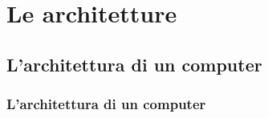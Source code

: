 \section[Le architetture]{Le architetture}

\subsection[L'architettura di un computer]{L'architettura di un computer}


\begin{frame}
	\frametitle{L'architettura di un computer}
	 
	\begin{block}{}
	
	\end{block}
	\begin{block}{}
	
	\end{block}
\end{frame}

